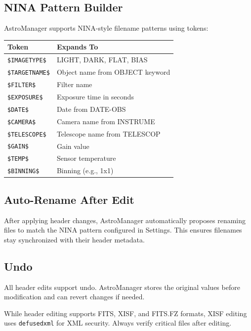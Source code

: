 \documentclass[11pt,a4paper]{article}
\begin{document}
\subsection{NINA Pattern Builder}

AstroManager supports NINA-style filename patterns using tokens:

\begin{center}
\begin{tabular}{ll}
\toprule
\textbf{Token} & \textbf{Expands To} \\
\midrule
\texttt{\$IMAGETYPE\$} & LIGHT, DARK, FLAT, BIAS \\
\texttt{\$TARGETNAME\$} & Object name from OBJECT keyword \\
\texttt{\$FILTER\$} & Filter name \\
\texttt{\$EXPOSURE\$} & Exposure time in seconds \\
\texttt{\$DATE\$} & Date from DATE-OBS \\
\texttt{\$CAMERA\$} & Camera name from INSTRUME \\
\texttt{\$TELESCOPE\$} & Telescope name from TELESCOP \\
\texttt{\$GAIN\$} & Gain value \\
\texttt{\$TEMP\$} & Sensor temperature \\
\texttt{\$BINNING\$} & Binning (e.g., 1x1) \\
\bottomrule
\end{tabular}
\end{center}

\subsection{Auto-Rename After Edit}

After applying header changes, AstroManager automatically proposes renaming files to match the NINA pattern configured in Settings. This ensures filenames stay synchronized with their header metadata.

\subsection{Undo}

All header edits support undo. AstroManager stores the original values before modification and can revert changes if needed.

\begin{warningbox}
While header editing supports FITS, XISF, and FITS.FZ formats, XISF editing uses \texttt{defusedxml} for XML security. Always verify critical files after editing.
\end{warningbox}
\end{document}
